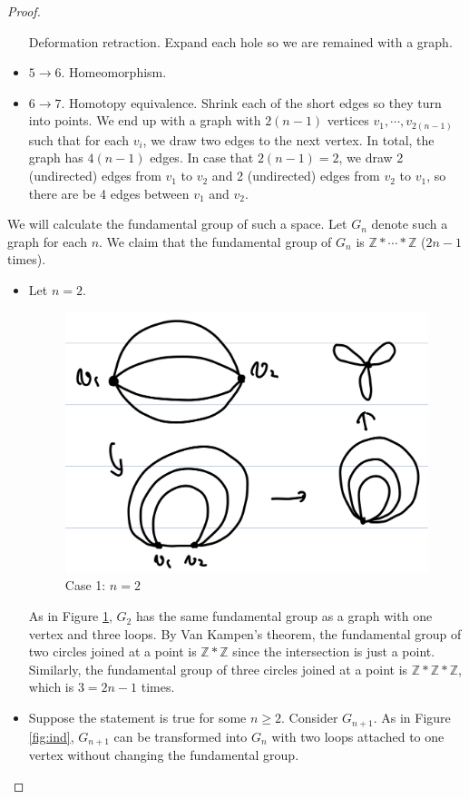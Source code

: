\documentclass[12pt, psamsfonts]{amsart}
\theoremstyle{definition}
\theoremstyle{remark}
\numberwithin{equation}{section}
\begin{document}
\begin{proof}
\begin{itemize}
      Deformation retraction.
      Expand each hole so we are remained with a graph.
    \item
      $5 \rightarrow 6$.
      Homeomorphism.
    \item
      $6 \rightarrow 7$.
      Homotopy equivalence.
      Shrink each of the short edges so they turn into points.
      We end up with a graph with $2(n - 1)$ vertices $v_1, \cdots, v_{2(n - 1)}$ such that for each $v_i$, we draw two edges to the next vertex.
      In total, the graph has $4(n - 1)$ edges.
      In case that $2(n - 1) = 2$, we draw 2 (undirected) edges from $v_1$ to $v_2$ and 2 (undirected) edges from $v_2$ to $v_1$, so there are be 4 edges between $v_1$ and $v_2$.
  \end{itemize}

  We will calculate the fundamental group of such a space.
  Let $G_n$ denote such a graph for each $n$.
  We claim that the fundamental group of $G_n$ is $\mathbb{Z} * \cdots * \mathbb{Z}$ ($2n - 1$ times).
  \begin{itemize}
    \item
      Let $n = 2$.
      \begin{figure}
        \includegraphics[width=.5\linewidth]{base_case.jpeg}
          \caption{Case 1: $n = 2$}
        \label{fig:n2}
      \end{figure}
      As in Figure \ref{fig:n2}, $G_2$ has the same fundamental group as a graph with one vertex and three loops.
      By Van Kampen's theorem, the fundamental group of two circles joined at a point is $\mathbb{Z} * \mathbb{Z}$ since the intersection is just a point.
      Similarly, the fundamental group of three circles joined at a point is $\mathbb{Z} * \mathbb{Z} * \mathbb{Z}$, which is $3 = 2n - 1$ times.
    \item
      Suppose the statement is true for some $n \geq 2$.
      Consider $G_{n + 1}$.
      As in Figure \ref{fig:ind}, $G_{n + 1}$ can be transformed into $G_{n}$ with two loops attached to one vertex without changing the fundamental group.
      \begin{figure}

\end{figure}
\end{itemize}
\end{proof}
\end{document}
